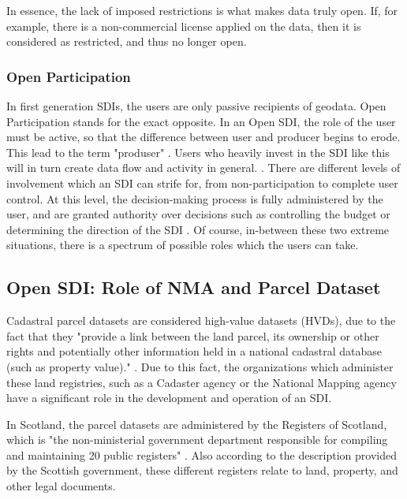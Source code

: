 In essence, the lack of imposed restrictions is what makes data truly open. If, for example, there is a non-commercial license applied on the data, then it is considered as restricted, and thus no longer open.

\subsubsection{Open Participation}


In first generation SDIs, the users are only passive recipients of geodata. Open Participation stands for the exact opposite. In an Open SDI, the role of the user must be active, so that the difference between user and producer begins to erode. This lead to the term "produser" \citep{status_national_open_SDI_2020}. Users who heavily invest in the SDI like this will in turn create data flow and activity in general. \citep{towards_user_oriented_open_data_strateg_2018}. There are different levels of involvement which an SDI can strife for, from non-participation to complete user control. At this level, the decision-making process is fully administered by the user, and are granted authority over decisions such as controlling the budget or determining the direction of the SDI \citep{towards_user_oriented_open_data_strateg_2018}. Of course, in-between these two extreme situations, there is a spectrum of possible roles which the users can take. 

\subsection{Open SDI: Role of NMA and Parcel Dataset}

Cadastral parcel datasets are considered high-value datasets (HVDs), due to the fact that they "provide a link between the land parcel, its ownership or other rights and potentially other information held in a national cadastral database (such as property value)." \citep{HVD_parcels_2020}. Due to this fact, the organizations which administer these land registries, such as a Cadaster agency or the National Mapping agency have a significant role in the development and operation of an SDI. 

In Scotland, the parcel datasets are administered by the Registers of Scotland, which is "the non-ministerial government department responsible for compiling and maintaining 20 public registers" \citep{scot_gov_ros_description}. Also according to the description provided by the Scottish government, these different registers relate to land, property, and other legal documents.

